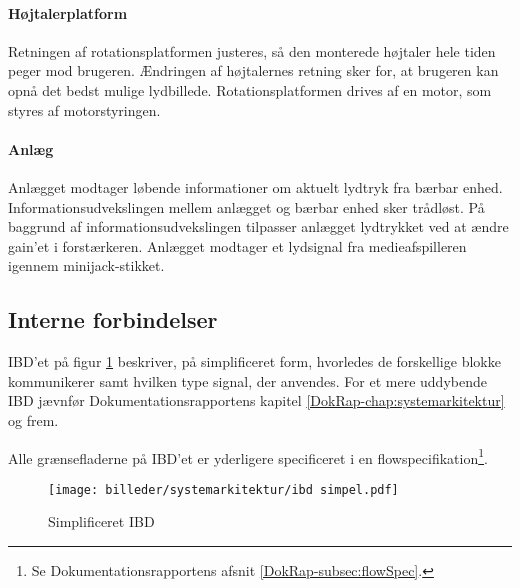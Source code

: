 \paragraph{Højtalerplatform} Retningen af rotationsplatformen justeres, så den monterede højtaler hele tiden peger mod brugeren. Ændringen af højtalernes retning sker for, at brugeren kan opnå det bedst mulige lydbillede. Rotationsplatformen drives af en motor, som styres af motorstyringen.

\paragraph{Anlæg} Anlægget modtager løbende informationer om aktuelt lydtryk fra bærbar enhed. Informationsudvekslingen mellem anlægget og bærbar enhed sker trådløst.
På baggrund af informationsudvekslingen tilpasser anlægget lydtrykket ved at ændre gain'et i forstærkeren. Anlægget modtager et lydsignal fra medieafspilleren igennem minijack-stikket.



\subsection{Interne forbindelser}

IBD'et på figur \ref{fig:ibdSimpel} beskriver, på simplificeret form, hvorledes de forskellige blokke kommunikerer samt hvilken type signal, der anvendes.  For et mere uddybende IBD jævnfør  Dokumentationsrapportens kapitel \vref{DokRap-chap:systemarkitektur} og frem.

Alle grænsefladerne på IBD'et er yderligere specificeret i en flowspecifikation\footnote{Se Dokumentationsrapportens afsnit \vref{DokRap-subsec:flowSpec}.}.

\begin{figure}[hb]
	\centering
	\texttt{[image: billeder/systemarkitektur/ibd simpel.pdf]}
	\caption{Simplificeret IBD}
	\label{fig:ibdSimpel}
\end{figure}

